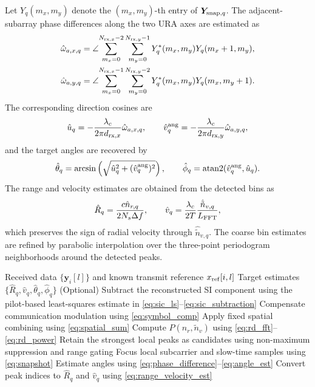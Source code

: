 \documentclass[conference]{IEEEtran}
\begin{document}
Let $Y_q(m_x,m_y)$ denote the $(m_x,m_y)$-th entry of $\bm{Y}_{{\rm snap},q}$. The adjacent-subarray phase differences along the two URA axes are estimated as
\begin{align}
\hat\omega_{a,x,q}&=\angle\!\sum_{m_x=0}^{N_{{\rm rx},x}-2}\sum_{m_y=0}^{N_{{\rm rx},y}-1}
Y_q^*(m_x,m_y)Y_q(m_x+1,m_y),\\
\hat\omega_{a,y,q}&=\angle\!\sum_{m_x=0}^{N_{{\rm rx},x}-1}\sum_{m_y=0}^{N_{{\rm rx},y}-2}
Y_q^*(m_x,m_y)Y_q(m_x,m_y+1).
\label{eq:phase_difference}
\end{align}
The corresponding direction cosines are
\begin{align}
    \hat u_q=-\frac{\lambda_c}{2\pi d_{{\rm rx},x}}\hat\omega_{a,x,q},\qquad
    \hat v_q^{\rm ang}=-\frac{\lambda_c}{2\pi d_{{\rm rx},y}}\hat\omega_{a,y,q},
    \label{eq:direction_cosines}
\end{align}
and the target angles are recovered by
\begin{align}
    \hat\theta_q=\arcsin\left(\sqrt{\hat u_q^2+(\hat v_q^{\rm ang})^2}\right),\qquad
    \hat\phi_q=\operatorname{atan2}(\hat v_q^{\rm ang},\hat u_q).
    \label{eq:angle_est}
\end{align}
The range and velocity estimates are obtained from the detected bins as
\begin{align}
    \hat R_q=\frac{c\hat n_{r,q}}{2N_s\Delta f},\qquad
    \hat v_q=\frac{\lambda_c}{2T}\frac{\hat{\tilde n}_{v,q}}{L_{\rm FFT}},
    \label{eq:range_velocity_est}
\end{align}
which preserves the sign of radial velocity through $\hat{\tilde n}_{v,q}$. The coarse bin estimates are refined by parabolic interpolation over the three-point periodogram neighborhoods around the detected peaks.

\begin{algorithm}[t]
\caption{Two-stage target parameter estimation}
\label{alg:parameter_estimation}
\begin{algorithmic}[1]
\REQUIRE Received data $\{\bm{y}_i[l]\}$ and known transmit reference $x_{\rm ref}[i,l]$
\ENSURE Target estimates $\{\hat R_q,\hat v_q,\hat\theta_q,\hat\phi_q\}$
\STATE (Optional) Subtract the reconstructed SI component using the pilot-based least-squares estimate in \eqref{eq:sic_ls}--\eqref{eq:sic_subtraction}
    \STATE Compensate communication modulation using \eqref{eq:symbol_comp}
\ENDFOR
\STATE Apply fixed spatial combining using \eqref{eq:spatial_sum}
\STATE Compute $P(n_r,\tilde n_v)$ using \eqref{eq:rd_fft}--\eqref{eq:rd_power}
\STATE Retain the strongest local peaks as candidates using non-maximum suppression and range gating
    \STATE Focus local subcarrier and slow-time samples using \eqref{eq:snapshot}
    \STATE Estimate angles using \eqref{eq:phase_difference}--\eqref{eq:angle_est}
    \STATE Convert peak indices to $\hat R_q$ and $\hat v_q$ using \eqref{eq:range_velocity_est}
\ENDFOR
\end{algorithmic}
\end{algorithm}
\end{document}
